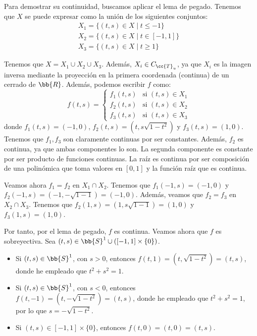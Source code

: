 \documentclass[12pt]{article}
\newcommand{\T}[0]{\cc{T}}
\begin{document}
\begin{ejercicio}[3 puntos]
\begin{enumerate}
            Para demostrar su continuidad, buscamos aplicar el lema de pegado. Tenemos que $X$ se puede expresar como la unión de los siguientes conjuntos:
            \begin{equation*}
                    \begin{array}{l}
                        X_1 = \{(t,s)\in X\mid t\leq -1\} \\
                        X_2 = \{(t,s)\in X\mid t\in [-1,1]\} \\
                        X_3 = \{(t,s)\in X\mid t\geq 1\}
                    \end{array}
            \end{equation*}

            Tenemos que $X=X_1\cup X_2\cup X_3$. Además, $X_i\in C_{\T_u}$, ya que $X_i$ es la imagen inversa mediante la proyección en la primera coordenada (continua) de un cerrado de $\bb{R}$.
            Además, podemos escribir $f$ como:
            \begin{equation*}
                f(t,s) = \left\{
                    \begin{array}{ll}
                        f_1(t,s) & \text{si } (t,s)\in X_1 \\
                        f_2(t,s) & \text{si } (t,s)\in X_2 \\
                        f_3(t,s) & \text{si } (t,s)\in X_3
                    \end{array}
                \right.
            \end{equation*}
            donde $f_1(t,s)=(-1,0)$, $f_2(t,s)=(t,s\sqrt{1-t^2})$ y $f_3(t,s)=(1,0)$.
            Tenemos que $f_1,f_3$ son claramente continuas por ser constantes.
            Además, $f_2$ es continua, ya que ambas componentes lo son. La segunda componente es constante por
            ser producto de funciones continuas. La raíz es continua por ser composición de
            una polinómica que toma valores en $[0,1]$ y la función raíz que es continua.

            Veamos ahora $f_1=f_2$ en $X_1\cap X_2$. Tenemos que $f_1(-1,s)=(-1,0)$ y $f_2(-1,s)=(-1,-\sqrt{1-1})=(-1,0)$.
            Además, veamos que $f_2=f_3$ en $X_2\cap X_3$. Tenemos que $f_2(1,s)=(1,s\sqrt{1-1})=(1,0)$ y $f_3(1,s)=(1,0)$.

            Por tanto, por el lema de pegado, $f$ es continua. Veamos ahora que $f$ es sobreyectiva. Sea $(t,s)\in \bb{S}^1 \cup ([-1,1]\times \{0\})$.
            \begin{itemize}
                \item Si $(t,s)\in \bb{S}^1$, con $s>0$, entonces $f(t,1) = (t, \sqrt{1-t^2}) = (t,s)$, donde he empleado que $t^2+s^2=1$.
                \item Si $(t,s)\in \bb{S}^1$, con $s<0$, entonces $f(t,-1) = (t, -\sqrt{1-t^2}) = (t,s)$, donde he empleado que $t^2+s^2=1$, por lo que $s=-\sqrt{1-t^2}$.
                \item Si $(t,s)\in [-1,1]\times \{0\}$, entonces $f(t,0) = (t, 0) = (t,s)$.
            \end{itemize}


\end{enumerate}
\end{ejercicio}
\end{document}
